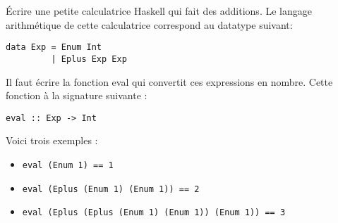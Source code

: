 \begin{Exercise}[title={Calculatrice Haskell}]
Écrire une petite calculatrice Haskell qui fait des additions.
Le langage arithmétique de cette calculatrice correspond au datatype suivant:
\begin{verbatim}
data Exp = Enum Int
         | Eplus Exp Exp
\end{verbatim}

Il faut écrire la fonction eval qui convertit ces expressions en nombre. Cette fonction à la signature suivante :
\begin{verbatim}
eval :: Exp -> Int
\end{verbatim}

Voici trois exemples :
\begin{itemize}
\item 
\begin{verbatim}
eval (Enum 1) == 1
\end{verbatim}

\item 
\begin{verbatim}
eval (Eplus (Enum 1) (Enum 1)) == 2
\end{verbatim}

\item 
\begin{verbatim}
eval (Eplus (Eplus (Enum 1) (Enum 1)) (Enum 1)) == 3
\end{verbatim}
\end{itemize}
\end{Exercise}